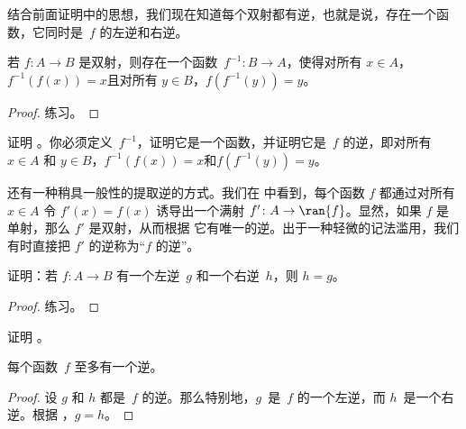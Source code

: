 \documentclass[../../../include/open-logic-section]{subfiles}
\begin{document}
\begin{explain}
  结合前面证明中的思想，我们现在知道每个双射都有逆，也就是说，存在一个函数，它同时是~$f$ 的左逆和右逆。
\end{explain}

\begin{prop}
若 $f\colon A \to B$ 是双射，则存在一个函数~$f^{-1}\colon B \to A$，使得对所有 $x \in A$，$f^{-1}(f(x)) = x$且对所有 $y \in B$，$f(f^{-1}(y)) = y$。
\end{prop}

\begin{proof}
练习。
\end{proof}

\begin{prob}
证明 。你必须定义~$f^{-1}$，证明它是一个函数，并证明它是~$f$ 的逆，即对所有 $x \in A$ 和 $y \in B$，$f^{-1}(f(x)) = x$和$f(f^{-1}(y)) = y$。
\end{prob}

\begin{explain}
还有一种稍具一般性的提取逆的方式。我们在  中看到，每个函数 $f$ 都通过对所有 $x \in A$ 令 $f'(x) = f(x)$ 诱导出一个满射 $f' \colon A \to \ran{f}$。显然，如果 $f$ 是单射，那么 $f'$ 是双射，从而根据  它有唯一的逆。出于一种轻微的记法滥用，我们有时直接把 $f'$ 的逆称为“$f$ 的逆”。
\end{explain}

\begin{prop}%
  证明：若 $f\colon A \to B$ 有一个左逆~$g$ 和一个右逆~$h$，则 $h = g$。
\end{prop}

\begin{proof}
  练习。
\end{proof}

\begin{prob}
  证明 。
\end{prob}

\begin{prop}
每个函数~$f$ 至多有一个逆。
\end{prop}

\begin{proof}
  设 $g$ 和 $h$ 都是~$f$ 的逆。那么特别地，$g$~是~$f$ 的一个左逆，而 $h$~是一个右逆。根据 ，$g = h$。
\end{proof}
\end{document}
